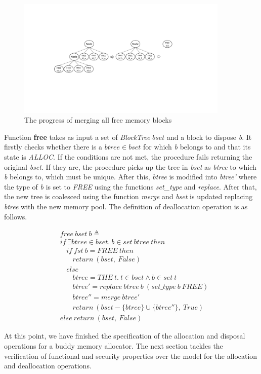 \begin{figure}[htbp]
	\centering
	\includegraphics[width=0.9\textwidth]{fig2.pdf}
	\caption{The progress of merging all free memory blocks}
	\label{fig:merginfreeblocks}
\end{figure}

Function \textbf{free} takes as input a set of \emph{BlockTree} $bset$ and a block to dispose \emph{b}. It firstly checks whether there is a $btree \in bset$ for which \emph{b} belongs to and that its state is \emph{ALLOC}. If the conditions are not met, the procedure fails returning the original \emph{bset}. If they are, the procedure picks up the tree in \emph{bset} as \emph{btree} to which \emph{b} belongs to, which must be unique. After this, \emph{btree} is modified into \emph{btree'} where the type of \emph{b} is set to \emph{FREE} using the functions \emph{set\_type} and \emph{replace}. After that, the new tree is coalesced using the function \emph{merge} and \emph{bset} is updated replacing \emph{btree} with the new memory pool. The definition of deallocation operation is as follows.

\begin{definition} 
\begin{align*}
&free\ bset\ b \triangleq \\
&if\ \exists btree \in bset.\ b \in set\ btree\ then \\
&\ \ \ \ if\ fst\ b = FREE\ then \\
&\ \ \ \ \ \ \ \ return\ (bset,\ False) \\
&\ \ \ \ else \\
&\ \ \ \ \ \ \ \ btree = THE\ t.\ t \in bset \wedge b \in set\ t \\
&\ \ \ \ \ \ \ \ btree' = replace\ btree\ b\ (set\_type\ b\ FREE) \\
&\ \ \ \ \ \ \ \ btree'' = merge\ btree' \\
&\ \ \ \ \ \ \ \ return\ (bset - \lbrace btree \rbrace \cup \lbrace btree'' \rbrace,\ True) \\
&else\ return\ (bset,\ False)
\end{align*}
\end{definition}

At this point, we have finished the specification of the allocation and disposal operations for a buddy memory allocator. The next section tackles the verification of functional and security properties over the model for the allocation and deallocation operations.